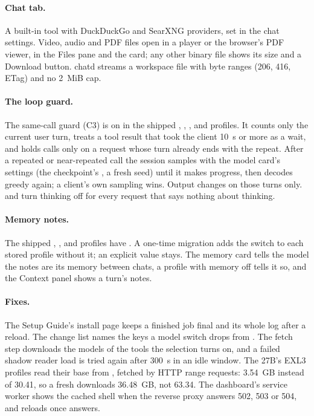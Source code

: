\paragraph{Chat tab.} A built-in  tool with DuckDuckGo and SearXNG providers, set in the chat settings. Video, audio and PDF files open in a player or the browser's PDF viewer, in the Files pane and the  card; any other binary file shows its size and a Download button. chatd streams a workspace file with byte ranges (206, 416, ETag) and no 2~MiB cap.

\paragraph{The loop guard.} The same-call guard (C3) is on in the shipped , , ,  and  profiles. It counts only the current user turn, treats a tool result that took the client 10~s or more as a wait, and holds calls only on a request whose turn already ends with the repeat. After a repeated or near-repeated call the session samples with the model card's settings (the checkpoint's , a fresh seed) until it makes progress, then decodes greedy again; a client's own sampling wins. Output changes on those turns only.  and  turn thinking off for every request that says nothing about thinking.

\paragraph{Memory notes.} The shipped , ,  and  profiles have . A one-time migration adds the switch to each stored profile without it; an explicit value stays. The memory card tells the model the notes are its memory between chats, a profile with memory off tells it so, and the Context panel shows a turn's notes.

\paragraph{Fixes.} The Setup Guide's install page keeps a finished job final and its whole log after a reload. The change list names the keys a model switch drops from . The fetch step downloads the models of the tools the selection turns on, and a failed shadow reader load is tried again after 300~s in an idle window. The 27B's EXL3 profiles read their base from , fetched by HTTP range requests: 3.54~GB instead of 30.41, so a fresh  downloads 36.48~GB, not 63.34. The dashboard's service worker shows the cached shell when the reverse proxy answers 502, 503 or 504, and reloads once  answers.

